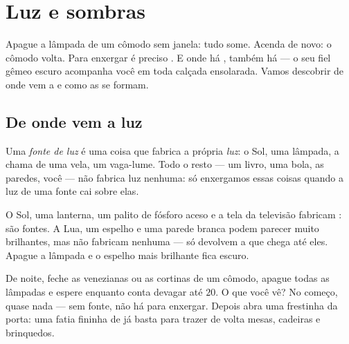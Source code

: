 \chapter{Luz e sombras}\label{ch:g1:light-and-shadows}

Apague a lâmpada de um cômodo sem janela: tudo some. Acenda de novo:
o cômodo volta. Para enxergar é preciso . E onde há , também há
 --- o seu fiel gêmeo escuro acompanha você em toda calçada
ensolarada. Vamos descobrir de onde vem a  e como as  se
formam.

\section{De onde vem a luz}

\begin{definition}\label{def:g1:light-and-shadows:source}
Uma \emph{fonte de luz} é uma coisa que fabrica a
própria \emph{luz}: o Sol, uma lâmpada, a chama de uma
vela, um vaga-lume. Todo o resto --- um livro, uma bola, as paredes,
você --- não fabrica luz nenhuma: só enxergamos essas coisas quando a
luz de uma fonte cai sobre elas.
\end{definition}

\begin{example}\label{ex:g1:light-and-shadows:sources}
O Sol, uma lanterna, um palito de fósforo aceso e a tela da televisão
fabricam : são fontes. A Lua, um espelho e uma parede branca podem
parecer muito brilhantes, mas não fabricam  nenhuma --- só devolvem
a  que chega até eles. Apague a lâmpada e o espelho mais brilhante
fica escuro.
\end{example}

\begin{example}\label{ex:g1:light-and-shadows:darkroom}
De noite, feche as venezianas ou as cortinas de um cômodo, apague
todas as lâmpadas e espere enquanto conta devagar até $20$. O que
você vê? No começo, quase nada --- sem fonte, não há  para
enxergar. Depois abra uma frestinha da porta: uma fatia fininha de
 já basta para trazer de volta mesas, cadeiras e brinquedos.
\end{example}


